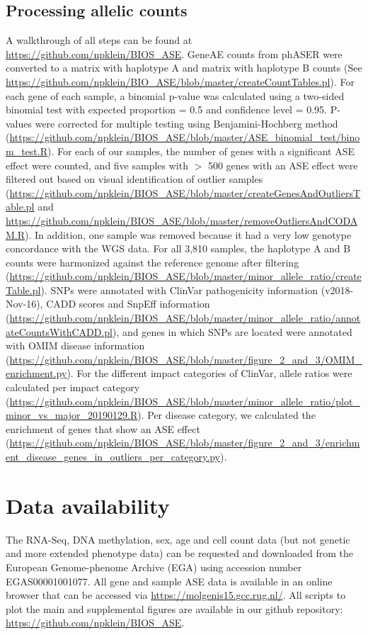 \subsection{Processing allelic counts}
A walkthrough of all steps can be found at \url{https://github.com/npklein/BIOS\_ASE}. GeneAE counts from phASER\cite{castelRareVariantPhasing2016} were converted to a matrix with haplotype A and matrix with haplotype B counts (See \url{https://github.com/npklein/BIO\_ASE/blob/master/createCountTables.pl}). For each gene of each sample, a binomial p-value was calculated using a two-sided binomial test with expected proportion = 0.5 and confidence level = 0.95. P-values were corrected for multiple testing using Benjamini-Hochberg method\cite{benjaminiControllingFalseDiscovery1995} (\url{https://github.com/npklein/BIOS\_ASE/blob/master/ASE\_binomial\_test/binom\_test.R}). For each of our samples, the number of genes with a significant ASE effect were counted, and five samples with $>$ 500 genes with an ASE effect were filtered out based on visual identification of outlier samples (\url{https://github.com/npklein/BIOS\_ASE/blob/master/createGenesAndOutliersTable.pl} and \url{https://github.com/npklein/BIOS\_ASE/blob/master/removeOutliersAndCODAM.R}). In addition, one sample was removed because it had a very low genotype concordance with the WGS data. For all 3,810 samples, the haplotype A and B counts were harmonized against the reference genome after filtering (\url{https://github.com/npklein/BIOS\_ASE/blob/master/minor\_allele\_ratio/createTable.pl}). SNPs were annotated with ClinVar pathogenicity information (v2018-Nov-16), CADD scores\cite{kircherGeneralFrameworkEstimating2014} and SnpEff information (\url{https://github.com/npklein/BIOS\_ASE/blob/master/minor\_allele\_ratio/annotateCountsWithCADD.pl}), and genes in which SNPs are located were annotated with OMIM disease information (\url{https://github.com/npklein/BIOS\_ASE/blob/master/figure\_2\_and\_3/OMIM\_enrichment.py}). For the different impact categories of ClinVar, allele ratios were calculated per impact category (\url{https://github.com/npklein/BIOS\_ASE/blob/master/minor\_allele\_ratio/plot\_minor\_vs\_major\_20190129.R}). Per disease category, we calculated the enrichment of genes that show an ASE effect (\url{https://github.com/npklein/BIOS\_ASE/blob/master/figure\_2\_and\_3/enrichment\_disease\_genes\_in\_outliers\_per\_category.py}). 

\section*{Data availability}
The RNA-Seq, DNA methylation, sex, age and cell count data (but not genetic and more extended phenotype data) can be requested and downloaded from the European Genome-phenome Archive (EGA) using accession number EGAS00001001077. All gene and sample ASE data is available in an online browser that can be accessed via \url{https://molgenis15.gcc.rug.nl/}. All scripts to plot the main and supplemental figures are available in our github repository: \url{https://github.com/npklein/BIOS\_ASE}.

